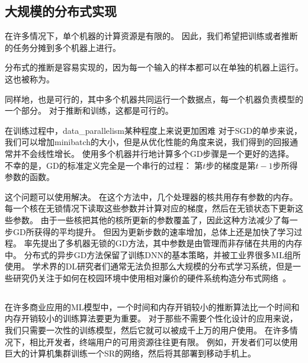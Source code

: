 \subsection{大规模的分布式实现}
\label{sec:large_scale_distributed_implementations}

在许多情况下，单个机器的计算资源是有限的。
因此，我们希望把训练或者推断的任务分摊到多个机器上进行。

分布式的推断是容易实现的，因为每一个输入的样本都可以在单独的机器上运行。
这也被称为。

同样地，也是可行的，其中多个机器共同运行一个数据点，每一个机器负责模型的一个部分。
对于推断和训练，这都是可行的。



在训练过程中，\gls{data_parallelism}某种程度上来说更加困难
对于\gls{SGD}的单步来说，我们可以增加\gls{minibatch}的大小，但是从优化性能的角度来说，我们得到的回报通常并不会线性增长。
使用多个机器并行地计算多个\gls{GD}步骤是一个更好的选择。
不幸的是，\gls{GD}的标准定义完全是一个串行的过程：
第$t$步的梯度是第$t-1$步所得参数的函数。


这个问题可以使用\citep{Bengio+Bengio96,Recht-et-al-NIPS2011}解决。
在这个方法中，几个处理器的核共用存有参数的内存。
每一个核在无锁情况下读取这些参数并计算对应的梯度，然后在无锁状态下更新这些参数。
由于一些核把其他的核所更新的参数覆盖了，因此这种方法减少了每一步\gls{GD}所获得的平均提升。
但因为更新步数的速率增加，总体上还是加快了学习过程。
\citet{Dean-et-al-NIPS2012}率先提出了多机器无锁的\gls{GD}方法，其中参数是由管理而非存储在共用的内存中。
分布式的异步\gls{GD}方法保留了训练\gls{DNN}的基本策略，并被工业界很多\gls{ML}组所使用\citep{chilimbi2014project,Wu-et-al-arXiv2015}。
学术界的\gls{DL}研究者们通常无法负担那么大规模的分布式学习系统，但是一些研究仍关注于如何在校园环境中使用相对廉价的硬件系统构造分布式网络~\citep{icml2013_coates13}。


\subsection{}
\label{sec:model_compression}

在许多商业应用的\gls{ML}模型中，一个时间和内存开销较小的推断算法比一个时间和内存开销较小的训练算法要更为重要。
对于那些不需要个性化设计的应用来说，我们只需要一次性的训练模型，然后它就可以被成千上万的用户使用。
在许多情况下，相比开发者，终端用户的可用资源往往更有限。
例如，开发者们可以使用巨大的计算机集群训练一个\gls{SR}的网络，然后将其部署到移动手机上。


